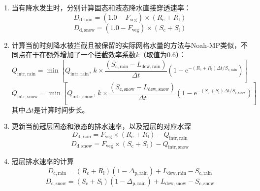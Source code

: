 \begin{enumerate}
  \item 当有降水发生时，分别计算固态和液态降水直接穿透速率：
    \begin{equation}
      D_{\mathrm{d,rain}}=\left(1.0-F_{\mathrm{veg}}\right) \times (R_{\mathrm{c}}+R_{\mathrm{l}})
    \end{equation}
    \begin{equation}
      D_{\mathrm{d,snow}}=\left(1.0-F_{\mathrm{veg}}\right) \times (S_{\mathrm{c}}+S_{\mathrm{l}})
    \end{equation}
  \item 计算当前时刻降水被拦截且被保留的实际网格水量的方法与Noah-MP类似，不同点在于在额外增加了一个拦截效率系数$k$（取值为0.6）：
    \begin{equation}
      Q_{\mathrm{intr,rain}} = \min\left[Q_{\mathrm{intr,rain}},\,  k \times \frac{(S_{\mathrm{c,rain}} - L_{\mathrm{dew,rain}})}{\Delta{t}} \left(1-{\mathrm e}^{-\left(R_{\mathrm{c}}+R_{\mathrm{l}}\right)\Delta{t}/S_{\mathrm{c,rain}}}\right)\right]
    \end{equation}
    \begin{equation}
      Q_{\mathrm{intr,snow}} = \min\left[Q_{\mathrm{intr,snow}},\, k \times \frac{(S_{\mathrm{c,snow}} - L_{\mathrm{dew,snow}})}{\Delta{t}}\left(1-{\mathrm e}^{-\left(S_{\mathrm{c}}+S_{\mathrm{l}}\right)\Delta{t}/S_{\mathrm{c,snow}}}\right)\right]
    \end{equation}
    其中${\Delta{t}}$是计算时间步长。
  \item 更新当前冠层固态和液态的排水速率，以及冠层的对应水深
    \begin{equation}
      D_{\mathrm{d,rain}}=F_{\mathrm{veg}} \times (R_{\mathrm{c}}+R_{\mathrm{l}})-Q_{\mathrm{intr,rain}}
    \end{equation}
    \begin{equation}
      D_{\mathrm{d,snow}}=F_{\mathrm{veg}} \times (S_{\mathrm{c}}+S_{\mathrm{l}})-Q_{\mathrm{intr,snow}}
    \end{equation}
  \item 冠层排水速率的计算
    \begin{equation}
      D_{\mathrm{c,rain}}=\left(R_{\mathrm{c}}+R_{\mathrm{l}}\right)\left(1-\Delta_{\mathrm{p,rain}}\right)+L_{\mathrm{dew,rain}}-S_{\mathrm{c,rain}}
    \end{equation}
    \begin{equation}
      D_{\mathrm{c,snow}}=\left(S_{\mathrm{c}}+S_{\mathrm{l}}\right)\left(1-\Delta_{\mathrm{p,rain}}\right)+L_{\mathrm{dew,snow}}-S_{\mathrm{c,snow}}
    \end{equation}

\end{enumerate}
